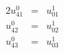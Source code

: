 \begin{alignat*}{2} 
	u_{41}^0 & {}={} & u_{01}^1\\
	u_{42}^0 & {}={} & u_{02}^1\\
	u_{43}^0 & {}={} & u_{03}^1
\end{alignat*}